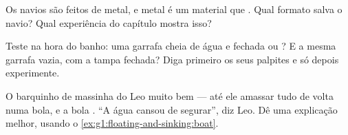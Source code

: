 \begin{exercise}[$\star$]\label{exo:g1:floating-and-sinking:7}
Os navios são feitos de metal, e metal é um material que . Qual
formato salva o navio? Qual experiência do capítulo mostra isso?
\end{exercise}

\begin{exercise}[$\star$]\label{exo:g1:floating-and-sinking:8}
Teste na hora do banho: uma garrafa cheia de água e fechada  ou
? E a mesma garrafa vazia, com a tampa fechada? Diga primeiro
os seus palpites e só depois experimente.
\end{exercise}

\begin{exercise}[$\star\star$]\label{exo:g1:floating-and-sinking:9}
O barquinho de massinha do Leo  muito bem --- até ele amassar
tudo de volta numa bola, e a bola . ``A água cansou de
segurar'', diz Leo. Dê uma explicação melhor, usando o
\cref{ex:g1:floating-and-sinking:boat}.
\end{exercise}
